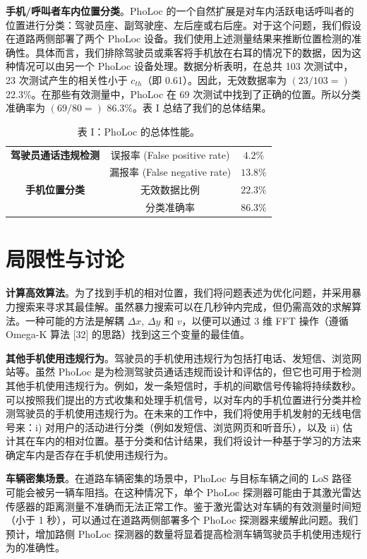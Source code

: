 \documentclass[journal, onecolumn]{IEEEtran}
\begin{document}
\textbf{手机/呼叫者车内位置分类}。PhoLoc 的一个自然扩展是对车内活跃电话呼叫者的位置进行分类：驾驶员座、副驾驶座、左后座或右后座。对于这个问题，我们假设在道路两侧部署了两个 PhoLoc 设备。我们使用上述测量结果来推断位置检测的准确性。具体而言，我们排除驾驶员或乘客将手机放在右耳的情况下的数据，因为这种情况可以由另一个 PhoLoc 设备处理。数据分析表明，在总共 103 次测试中，23 次测试产生的相关性小于 $c_{th}$（即 0.61）。因此，无效数据率为 $(23/103=)$ 22.3\%。在那些有效测量中，PhoLoc 在 69 次测试中找到了正确的位置。所以分类准确率为 $(69/80=)$ 86.3\%。表 I 总结了我们的总体结果。

\begin{table}[htbp]
\caption{表 I：PhoLoc 的总体性能。}
\centering
\begin{tabular}{|c|c|c|}
\hline
\textbf{驾驶员通话违规检测} & 误报率 (False positive rate) & $4.2\%$ \\
 & 漏报率 (False negative rate) & $13.8\%$ \\
\hline
\textbf{手机位置分类} & 无效数据比例 & $22.3\%$ \\
 & 分类准确率 & $86.3\%$ \\
\hline
\end{tabular}
\label{tab:1}
\end{table}

\section{局限性与讨论}

\textbf{计算高效算法}。为了找到手机的相对位置，我们将问题表述为优化问题，并采用暴力搜索来寻求其最佳解。虽然暴力搜索可以在几秒钟内完成，但仍需高效的求解算法。一种可能的方法是解耦 $\Delta x$, $\Delta y$ 和 $v$，以便可以通过 3 维 FFT 操作（遵循 Omega-K 算法 [32] 的思路）找到这三个变量的最佳值。

\textbf{其他手机使用违规行为}。驾驶员的手机使用违规行为包括打电话、发短信、浏览网站等。虽然 PhoLoc 是为检测驾驶员通话违规而设计和评估的，但它也可用于检测其他手机使用违规行为。例如，发一条短信时，手机的间歇信号传输将持续数秒。可以按照我们提出的方式收集和处理手机信号，以对车内的手机位置进行分类并检测驾驶员的手机使用违规行为。在未来的工作中，我们将使用手机发射的无线电信号来：i) 对用户的活动进行分类（例如发短信、浏览网页和听音乐），以及 ii) 估计其在车内的相对位置。基于分类和估计结果，我们将设计一种基于学习的方法来确定车内是否存在手机使用违规行为。

\textbf{车辆密集场景}。在道路车辆密集的场景中，PhoLoc 与目标车辆之间的 LoS 路径可能会被另一辆车阻挡。在这种情况下，单个 PhoLoc 探测器可能由于其激光雷达传感器的距离测量不准确而无法正常工作。鉴于激光雷达对车辆的有效测量时间短（小于 1 秒），可以通过在道路两侧部署多个 PhoLoc 探测器来缓解此问题。我们预计，增加路侧 PhoLoc 探测器的数量将显着提高检测车辆驾驶员手机使用违规行为的准确性。
\end{document}
